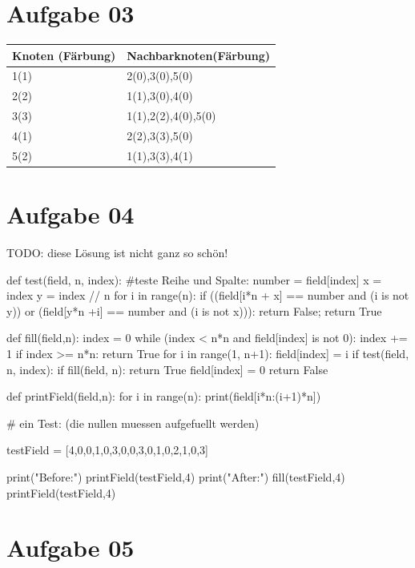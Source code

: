\documentclass[10pt,a4paper]{article}
\begin{document}
\section*{Aufgabe 03}
    \begin{tabular}{|l |l|}
        \hline
        Knoten (Färbung) & Nachbarknoten(Färbung) \\
        \hline \hline
        1(1) & 2(0),3(0),5(0) \\ \hline
        2(2) & 1(1),3(0),4(0) \\ \hline
        3(3) & 1(1),2(2),4(0),5(0) \\ \hline
        4(1) & 2(2),3(3),5(0) \\ \hline
        5(2) & 1(1),3(3),4(1)\\ \hline
    \end{tabular}


\section*{Aufgabe 04}
    TODO: diese L\"osung ist nicht ganz so sch\"on!

    \begin{python}[frame=single]
def test(field, n, index):
    #teste Reihe und Spalte:
    number = field[index]
    x = index %
    y = index // n
    for i in range(n):
        if ((field[i*n + x] == number and (i is not y))
            or (field[y*n +i] == number and (i is not x))):
            return False;
    return True

def fill(field,n):
    index = 0
    while (index < n*n and field[index] is not 0):
        index += 1
    if index >= n*n:
        return True
    for i in range(1, n+1):
        field[index] = i
        if test(field, n, index):
            if fill(field, n):
                return True
    field[index] = 0
    return False


def printField(field,n):
    for i in range(n):
        print(field[i*n:(i+1)*n])

# ein Test: (die nullen muessen aufgefuellt werden)

testField = [4,0,0,1,0,3,0,0,3,0,1,0,2,1,0,3]

print("Before:")
printField(testField,4)
print("After:")
fill(testField,4)
printField(testField,4)

    \end{python}
    
\section*{Aufgabe 05}
\end{document}
